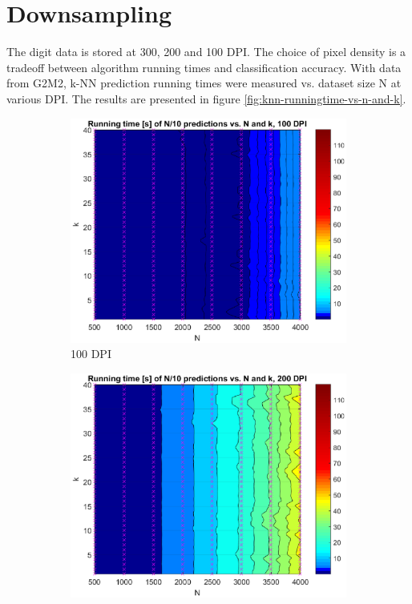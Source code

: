 \section{Downsampling}
The digit data is stored at 300, 200 and 100 DPI.
The choice of pixel density is a tradeoff between
algorithm running times and classification accuracy.
With data from G2M2, k-NN prediction running times
were measured vs. dataset size N at various DPI.
The results
are presented in figure \ref{fig:knn-runningtime-vs-n-and-k}.
\begin{figure}[ht]
	\centering
	\begin{subfigure}[t]{0.33\textwidth}
		\includegraphics[width = \textwidth]{graphics/knn-runningtime-vs-n-and-k-2-2-dpi100}
		\caption{100 DPI}
	\end{subfigure}
	\begin{subfigure}[t]{0.33\textwidth}
		\includegraphics[width = \textwidth]{graphics/knn-runningtime-vs-n-and-k-2-2-dpi200}

\end{subfigure}
\end{figure}
